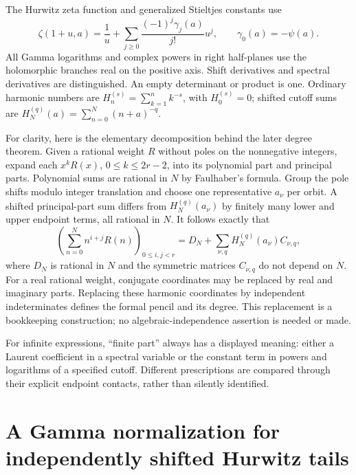\documentclass[11pt]{article}
\theoremstyle{definition}
\theoremstyle{remark}
\numberwithin{equation}{section}
\begin{document}
The Hurwitz zeta function and generalized Stieltjes constants use
\[
 \zeta(1+u,a)=\frac1u+
       \sum_{j\ge0}\frac{(-1)^j\gamma_j(a)}{j!}u^j,
 \qquad \gamma_0(a)=-\psi(a).
\]
All Gamma logarithms and complex powers in right half-planes use the
holomorphic branches real on the positive axis. Shift derivatives and
spectral derivatives are distinguished. An empty determinant or product
is one. Ordinary harmonic numbers are
$H_n^{(s)}=\sum_{k=1}^{n}k^{-s}$, with $H_0^{(s)}=0$; shifted
cutoff sums are $H_N^{(q)}(a)=\sum_{n=0}^{N}(n+a)^{-q}$.

For clarity, here is the elementary decomposition behind the later
degree theorem. Given a rational weight $R$ without poles on the
nonnegative integers, expand each $x^kR(x)$, $0\le k\le2r-2$, into
its polynomial part and principal parts. Polynomial sums are rational
in $N$ by Faulhaber's formula. Group the pole shifts modulo integer
translation and choose one representative $a_\nu$ per orbit. A shifted
principal-part sum differs from $H_N^{(q)}(a_\nu)$ by finitely many
lower and upper endpoint terms, all rational in $N$. It follows exactly
that
\begin{equation}\label{scope:harmonic-decomposition}
 \left(\sum_{n=0}^{N}n^{i+j}R(n)\right)_{0\le i,j<r}
 =D_N+\sum_{\nu,q}H_N^{(q)}(a_\nu)C_{\nu,q},
\end{equation}
where $D_N$ is rational in $N$ and the symmetric matrices
$C_{\nu,q}$ do not depend on $N$. For a real rational weight,
conjugate coordinates may be replaced by real and imaginary parts.
Replacing these harmonic coordinates by independent indeterminates
defines the formal pencil and its degree. This replacement is a
bookkeeping construction; no algebraic-independence assertion is
needed or made.

For infinite expressions, ``finite part'' always has a displayed
meaning: either a Laurent coefficient in a spectral variable or the
constant term in powers and logarithms of a specified cutoff.
Different prescriptions are compared through their explicit endpoint
contacts, rather than silently identified.


\section{A Gamma normalization for independently shifted Hurwitz tails}
\label{bil:section}
\end{document}
